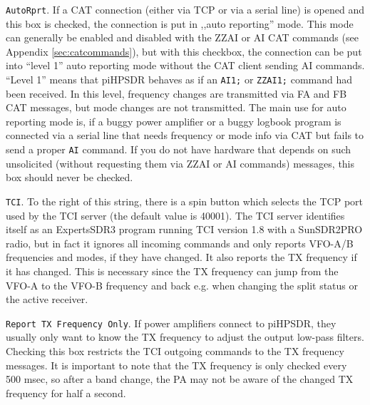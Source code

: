 \documentclass[12pt]{book}
\def\rett#1{\texttt{\color{red}#1}}
\def\pH{pi\-HPSDR\xspace}
\begin{document}
\rett{AutoRprt}. If a CAT connection (either via TCP or via a serial line) is opened and this box is checked,
the connection is put in ,,auto reporting'' mode. This mode can generally be enabled and disabled with the
ZZAI or AI CAT commands (see Appendix \ref{sec:catcommands}), but with this checkbox, the connection can be put
into ``level 1'' auto reporting mode without the CAT client sending AI commands. ``Level 1'' means that \pH
behaves as if an \texttt{AI1;} or \texttt{ZZAI1;} command had been received. In this level, frequency changes
are transmitted via FA and FB CAT messages, but mode changes are not transmitted.
The main use for auto reporting mode is, if a buggy power amplifier or a buggy logbook program
is connected via a serial line that needs frequency or mode  info via CAT but fails to send a proper
\texttt{AI} command.  If you do not have hardware that depends
on such unsolicited (without requesting them via ZZAI or AI commands) messages, this box should never be checked.

\rett{TCI}. To the right of this string, there is a spin button which selects the TCP port used by the
TCI  server (the default value is 40001). The TCI server identifies itself as an ExpertsSDR3 program
running TCI version 1.8 with a SunSDR2PRO radio, but in fact it ignores all incoming commands and only
reports VFO-A/B frequencies and modes, if they have changed. It also reports the TX frequency if it has changed.
This is necessary since the TX frequency can jump from the VFO-A to the VFO-B frequency and back e.g. when
changing the split status or the active receiver.

\rett{Report TX  Frequency Only}. If power amplifiers connect to \pH, they usually only want to know the
TX frequency to adjust the output low-pass filters. Checking this box restricts the TCI outgoing commands
to the TX  frequency messages. It is important  to note that the TX frequency is only  checked every
500 msec, so after a band change, the PA may  not be aware of  the changed TX frequency for half  a second.


\end{document}

